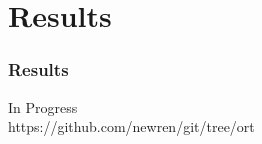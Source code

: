 \documentclass[compress,t]{beamer}
\begin{document}
\section[Results]{Results}

\begin{frame}
  \frametitle{Results}

  \vfill
  \begin{center}
    In Progress\\[2em]

    https://github.com/newren/git/tree/ort
  \end{center}
  \vfill

\end{frame}

\end{document}
